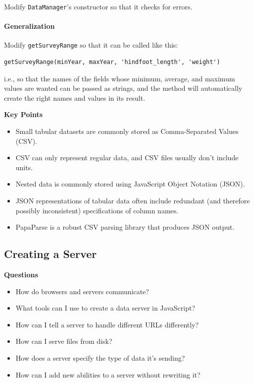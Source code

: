 Modify \texttt{DataManager}'s constructor so that it checks for errors.

\paragraph{Generalization}\label{generalization}

Modify \texttt{getSurveyRange} so that it can be called like this:

\begin{verbatim}
getSurveyRange(minYear, maxYear, 'hindfoot_length', 'weight')
\end{verbatim}

i.e., so that the names of the fields whose minimum, average, and
maximum values are wanted can be passed as strings, and the method will
automatically create the right names and values in its result.

\textbf{Key Points}

\begin{itemize}
\tightlist
\item
  Small tabular datasets are commonly stored as Comma-Separated Values
  (CSV).
\item
  CSV can only represent regular data, and CSV files usually don't
  include units.
\item
  Nested data is commonly stored using JavaScript Object Notation
  (JSON).
\item
  JSON representations of tabular data often include redundant (and
  therefore possibly inconsistent) specifications of column names.
\item
  PapaParse is a robust CSV parsing library that produces JSON output.
\end{itemize}

\hypertarget{s:server}{\subsection{Creating a Server}\label{s:server}}

\textbf{Questions}

\begin{itemize}
\tightlist
\item
  How do browsers and servers communicate?
\item
  What tools can I use to create a data server in JavaScript?
\item
  How can I tell a server to handle different URLs differently?
\item
  How can I serve files from disk?
\item
  How does a server specify the type of data it's sending?
\item
  How can I add new abilities to a server without rewriting it?
\end{itemize}

